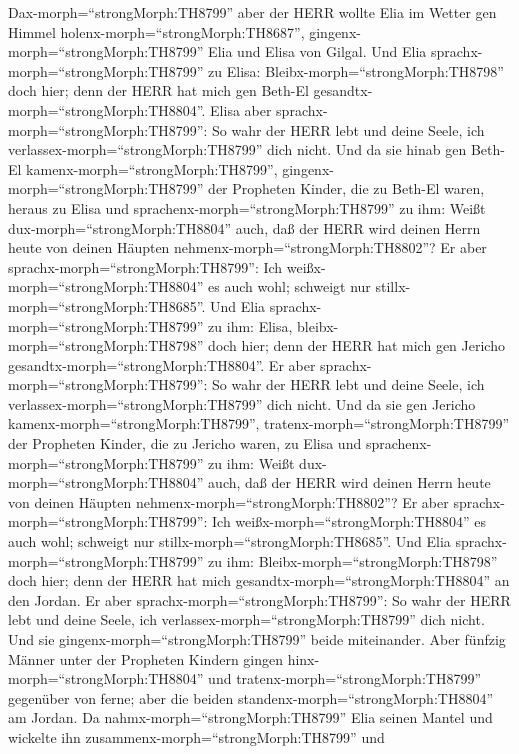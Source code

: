  Dax-morph=``strongMorph:TH8799'' aber der HERR wollte Elia
im Wetter gen Himmel holenx-morph=``strongMorph:TH8687'',
gingenx-morph=``strongMorph:TH8799'' Elia und Elisa von Gilgal.
 Und Elia sprachx-morph=``strongMorph:TH8799'' zu Elisa:
Bleibx-morph=``strongMorph:TH8798'' doch hier; denn der HERR hat mich
gen Beth-El gesandtx-morph=``strongMorph:TH8804''. Elisa aber
sprachx-morph=``strongMorph:TH8799'': So wahr der HERR lebt und deine
Seele, ich verlassex-morph=``strongMorph:TH8799'' dich nicht. Und da sie
hinab gen Beth-El kamenx-morph=``strongMorph:TH8799'', 
gingenx-morph=``strongMorph:TH8799'' der Propheten Kinder, die zu
Beth-El waren, heraus zu Elisa und
sprachenx-morph=``strongMorph:TH8799'' zu ihm: Weißt
dux-morph=``strongMorph:TH8804'' auch, daß der HERR wird deinen Herrn
heute von deinen Häupten nehmenx-morph=``strongMorph:TH8802''? Er aber
sprachx-morph=``strongMorph:TH8799'': Ich
weißx-morph=``strongMorph:TH8804'' es auch wohl; schweigt nur
stillx-morph=``strongMorph:TH8685''.  Und Elia
sprachx-morph=``strongMorph:TH8799'' zu ihm: Elisa,
bleibx-morph=``strongMorph:TH8798'' doch hier; denn der HERR hat mich
gen Jericho gesandtx-morph=``strongMorph:TH8804''. Er aber
sprachx-morph=``strongMorph:TH8799'': So wahr der HERR lebt und deine
Seele, ich verlassex-morph=``strongMorph:TH8799'' dich nicht. Und da sie
gen Jericho kamenx-morph=``strongMorph:TH8799'', 
tratenx-morph=``strongMorph:TH8799'' der Propheten Kinder, die zu
Jericho waren, zu Elisa und sprachenx-morph=``strongMorph:TH8799'' zu
ihm: Weißt dux-morph=``strongMorph:TH8804'' auch, daß der HERR wird
deinen Herrn heute von deinen Häupten
nehmenx-morph=``strongMorph:TH8802''? Er aber
sprachx-morph=``strongMorph:TH8799'': Ich
weißx-morph=``strongMorph:TH8804'' es auch wohl; schweigt nur
stillx-morph=``strongMorph:TH8685''.  Und Elia
sprachx-morph=``strongMorph:TH8799'' zu ihm:
Bleibx-morph=``strongMorph:TH8798'' doch hier; denn der HERR hat mich
gesandtx-morph=``strongMorph:TH8804'' an den Jordan. Er aber
sprachx-morph=``strongMorph:TH8799'': So wahr der HERR lebt und deine
Seele, ich verlassex-morph=``strongMorph:TH8799'' dich nicht. Und sie
gingenx-morph=``strongMorph:TH8799'' beide miteinander. 
Aber fünfzig Männer unter der Propheten Kindern gingen
hinx-morph=``strongMorph:TH8804'' und
tratenx-morph=``strongMorph:TH8799'' gegenüber von ferne; aber die
beiden standenx-morph=``strongMorph:TH8804'' am Jordan.  Da
nahmx-morph=``strongMorph:TH8799'' Elia seinen Mantel und wickelte ihn
zusammenx-morph=``strongMorph:TH8799'' und

